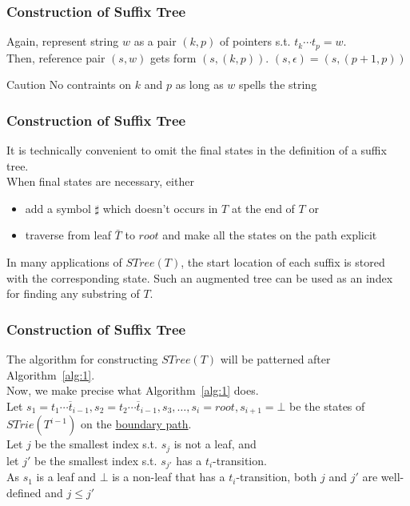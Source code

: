 \documentclass[compress,usenames,dvipsnames]{beamer}
\begin{document}
\begin{frame}\frametitle{Construction of Suffix Tree}
    Again, represent string $w$ as a pair $(k, p)$ of pointers s.t. $t_k \cdots t_p = w$. \\
    Then, reference pair $(s, w)$ gets form $(s, (k, p))$. $(s, \epsilon) = (s, (p + 1, p))$ \\
    \begin{alertblock}{Caution}
        No contraints on $k$ and $p$ as long as $w$ spells the string
    \end{alertblock}
\end{frame}

\begin{frame}\frametitle{Construction of Suffix Tree}
    It is technically convenient to omit the final states in the definition of a suffix tree. \\
    When final states are necessary, either \\
    \begin{itemize}
        \item add a symbol $\sharp$ which doesn't occurs in $T$ at the end of $T$ or 
        \item traverse from leaf $\bar{T}$ to $root$ and make all the states on the path explicit
    \end{itemize}
    In many applications of $STree(T)$, the start location of each suffix is stored with the corresponding state. Such an augmented tree can be used as an index for finding any substring of $T$.
\end{frame}

\begin{frame}\frametitle{Construction of Suffix Tree}
    The algorithm for constructing $STree(T)$ will be patterned after Algorithm~\ref{alg:1}. \\
    Now, we make precise what Algorithm~\ref{alg:1} does. \\
    \hfill \break
    Let $s_1 = \overline{t_1\cdots t_{i-1}},s_2=\overline{t_2\cdots t_{i-1}},s_3,\ldots,s_i=root,s_{i+1}=\bot$ be the states of $STrie(T^{i-1})$ on the \underline{boundary path}. \\
    \hfill \break
    Let $j$ be the smallest index s.t. $s_j$ is not a leaf, and \\
    let $j'$ be the smallest index s.t. $s_{j'}$ has a $t_i$-transition. \\
    \hfill \break
    As $s_1$ is a leaf and $\bot$ is a non-leaf that has a $t_i$-transition, both $j$ and $j'$ are well-defined and $j \leq j'$
\end{frame}
\end{document}
